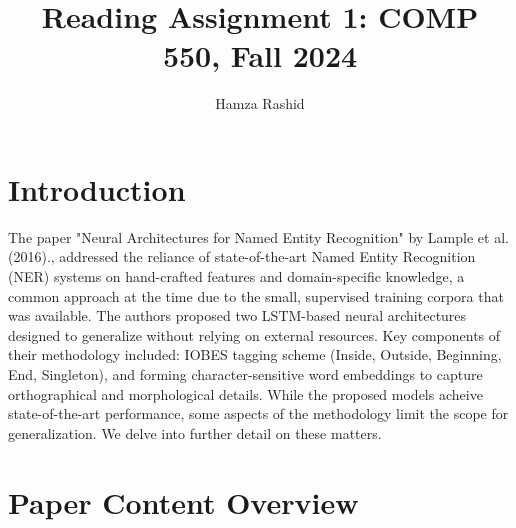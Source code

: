 \documentclass[11pt]{article}
\title{Reading Assignment 1: COMP 550, Fall 2024}
\author{Hamza Rashid}
\date{}
\begin{document}
\maketitle
\section*{Introduction}


The paper "Neural Architectures for 
Named Entity Recognition" by Lample et al. (2016)., 
addressed the reliance of state-of-the-art 
Named Entity Recognition (NER) systems on 
hand-crafted  features and domain-specific knowledge, 
a common approach at the time due to the small, 
supervised training corpora that was available. 
The authors proposed two LSTM-based neural 
architectures designed to generalize without 
relying on external resources. Key 
components of their methodology included: 
IOBES tagging scheme (Inside, Outside, Beginning, 
End, Singleton), and forming character-sensitive word 
embeddings to capture orthographical and morphological 
details. While the proposed models acheive 
state-of-the-art performance, some aspects
of the methodology limit the scope for generalization. 
We delve into further detail on these matters.



\section*{Paper Content Overview}

\end{document}
